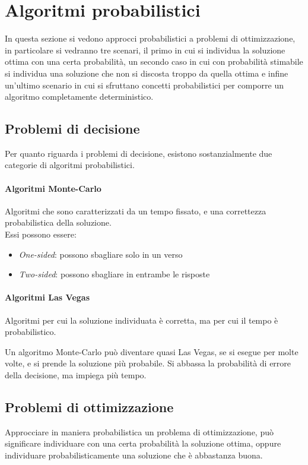 \section{Algoritmi probabilistici}
In questa sezione si vedono approcci probabilistici a problemi di ottimizzazione, 
in particolare si vedranno tre scenari, il primo in cui si individua la soluzione ottima
con una certa probabilità, un secondo caso in cui con probabilità stimabile si individua una 
soluzione che non si discosta troppo da quella ottima e infine un'ultimo scenario in cui 
si sfruttano concetti probabilistici per comporre un algoritmo completamente deterministico.

\subsection{Problemi di decisione}
Per quanto riguarda i problemi di decisione, esistono sostanzialmente due categorie
di algoritmi probabilistici.

\paragraph{Algoritmi Monte-Carlo}
Algoritmi che sono caratterizzati da un tempo fissato, e una 
correttezza probabilistica della soluzione.\\
Essi possono essere:
\begin{itemize}
    \item \emph{One-sided}: possono sbagliare solo in un verso 
    \item \emph{Two-sided}: possono sbagliare in entrambe le risposte
\end{itemize}

\paragraph{Algoritmi Las Vegas}
Algoritmi per cui la soluzione individuata è corretta, ma per cui il tempo è 
probabilistico.

\begin{remark}
    Un algoritmo Monte-Carlo può diventare quasi Las Vegas, se si esegue per molte volte, 
    e si prende la soluzione più probabile. Si abbassa la probabilità di errore della decisione, 
    ma impiega più tempo.
\end{remark}

\subsection{Problemi di ottimizzazione}
Approcciare in maniera probabilistica un problema di ottimizzazione, può significare 
individuare con una certa probabilità la soluzione ottima, 
oppure individuare probabilisticamente una soluzione che è abbastanza buona.
